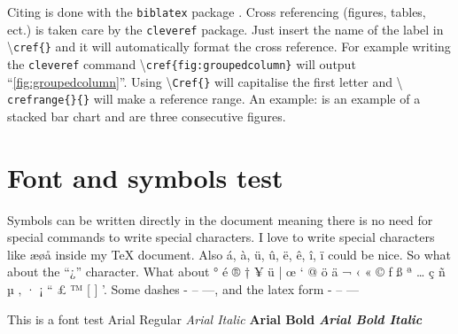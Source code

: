 Citing is done with the \texttt{biblatex} package \cite{biblatex}.
Cross referencing (figures, tables, ect.) is taken care by the
\texttt{cleveref} package. Just insert the name of the label in
\textbackslash \texttt{cref\{\}} and it will automatically format the
cross reference. For example writing the \texttt{cleveref} command
\textbackslash \texttt{cref\{fig:groupedcolumn\}} will output
``\cref{fig:groupedcolumn}''. Using \textbackslash \texttt{Cref\{\}}
will capitalise the first letter and \textbackslash
\texttt{crefrange\{\}\{\}} will make a reference range. An example:
 is an example of a stacked bar chart and
 are three consecutive figures.

\section{Font and symbols test}
Symbols can be written directly in the document meaning there is no
need for special commands to write special characters. I love to
write special characters like æøå inside my \TeX{} document. Also á,
à, ü, û, ë, ê, î, ï could be nice. So what about the ``¿'' character.
What about ° é ® † ¥ ü | œ ‘ @ ö ä ¬ ‹ « © ƒ ß ª … ç ñ µ ‚ · ¡ “ £ ™
[ ] '. Some dashes - – —, and the latex form - -- ---

This is a font test \newline
Arial Regular \newline
\textit{Arial Italic} \newline
\textbf{Arial Bold} \newline
\textbf{\textit{Arial Bold Italic}}
